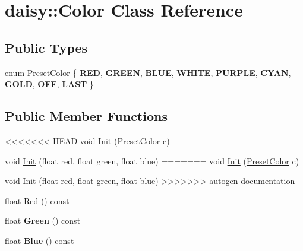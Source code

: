 \hypertarget{classdaisy_1_1_color}{}\section{daisy\+:\+:Color Class Reference}
\label{classdaisy_1_1_color}
\subsection*{Public Types}
\begin{DoxyCompactItemize}
\item 
enum \hyperlink{classdaisy_1_1_color_af93d31d5fc63705c228bf9da407c9a40}{Preset\+Color} \{ \newline
{\bfseries R\+ED}, 
{\bfseries G\+R\+E\+EN}, 
{\bfseries B\+L\+UE}, 
{\bfseries W\+H\+I\+TE}, 
\newline
{\bfseries P\+U\+R\+P\+LE}, 
{\bfseries C\+Y\+AN}, 
{\bfseries G\+O\+LD}, 
{\bfseries O\+FF}, 
\newline
{\bfseries L\+A\+ST}
 \}
\end{DoxyCompactItemize}
\subsection*{Public Member Functions}
\begin{DoxyCompactItemize}
\item 
<<<<<<< HEAD
void \hyperlink{classdaisy_1_1_color_a0ebd169976dd93434e4523697b16559b}{Init} (\hyperlink{classdaisy_1_1_color_af93d31d5fc63705c228bf9da407c9a40}{Preset\+Color} c)
\item 
void \hyperlink{classdaisy_1_1_color_a44cd04ee19a41442be79ec47711a2bf5}{Init} (float red, float green, float blue)
=======
void \hyperlink{classdaisy_1_1_color_a60f93e3f16f178f524a288ce349ad492}{Init} (\hyperlink{classdaisy_1_1_color_af93d31d5fc63705c228bf9da407c9a40}{Preset\+Color} c)
\item 
void \hyperlink{classdaisy_1_1_color_a7ed62acfe4093fc477e860bd2b21dbaa}{Init} (float red, float green, float blue)
>>>>>>> autogen documentation
\item 
float \hyperlink{classdaisy_1_1_color_ab645aa34a553a044e9c901546e78ed8f}{Red} () const
\item 
\mbox{\label{classdaisy_1_1_color_a82e79edf660803d82921c82a431574b2}} 
float {\bfseries Green} () const
\item 
\mbox{\label{classdaisy_1_1_color_a9270f936191af9fcd59dad58a8ab0387}} 
float {\bfseries Blue} () const
\end{DoxyCompactItemize}


